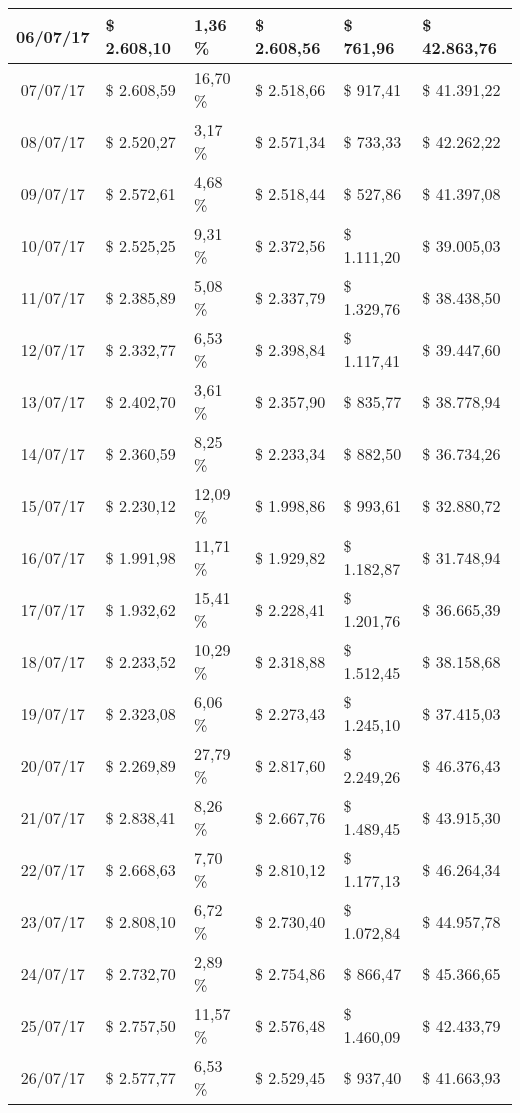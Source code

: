 \begin{small}
\begin{longtable}{|c|l|l|l|l|l|}
06/07/17 & \$ 2.608,10 & 1,36 \% & \$ 2.608,56 & \$ 761,96 & \$ 42.863,76 \\ \hline
07/07/17 & \$ 2.608,59 & 16,70 \% & \$ 2.518,66 & \$ 917,41 & \$ 41.391,22 \\ \hline
08/07/17 & \$ 2.520,27 & 3,17 \% & \$ 2.571,34 & \$ 733,33 & \$ 42.262,22 \\ \hline
09/07/17 & \$ 2.572,61 & 4,68 \% & \$ 2.518,44 & \$ 527,86 & \$ 41.397,08 \\ \hline
10/07/17 & \$ 2.525,25 & 9,31 \% & \$ 2.372,56 & \$ 1.111,20 & \$ 39.005,03 \\ \hline
11/07/17 & \$ 2.385,89 & 5,08 \% & \$ 2.337,79 & \$ 1.329,76 & \$ 38.438,50 \\ \hline
12/07/17 & \$ 2.332,77 & 6,53 \% & \$ 2.398,84 & \$ 1.117,41 & \$ 39.447,60 \\ \hline
13/07/17 & \$ 2.402,70 & 3,61 \% & \$ 2.357,90 & \$ 835,77 & \$ 38.778,94 \\ \hline
14/07/17 & \$ 2.360,59 & 8,25 \% & \$ 2.233,34 & \$ 882,50 & \$ 36.734,26 \\ \hline
15/07/17 & \$ 2.230,12 & 12,09 \% & \$ 1.998,86 & \$ 993,61 & \$ 32.880,72 \\ \hline
16/07/17 & \$ 1.991,98 & 11,71 \% & \$ 1.929,82 & \$ 1.182,87 & \$ 31.748,94 \\ \hline
17/07/17 & \$ 1.932,62 & 15,41 \% & \$ 2.228,41 & \$ 1.201,76 & \$ 36.665,39 \\ \hline
18/07/17 & \$ 2.233,52 & 10,29 \% & \$ 2.318,88 & \$ 1.512,45 & \$ 38.158,68 \\ \hline
19/07/17 & \$ 2.323,08 & 6,06 \% & \$ 2.273,43 & \$ 1.245,10 & \$ 37.415,03 \\ \hline
20/07/17 & \$ 2.269,89 & 27,79 \% & \$ 2.817,60 & \$ 2.249,26 & \$ 46.376,43 \\ \hline
21/07/17 & \$ 2.838,41 & 8,26 \% & \$ 2.667,76 & \$ 1.489,45 & \$ 43.915,30 \\ \hline
22/07/17 & \$ 2.668,63 & 7,70 \% & \$ 2.810,12 & \$ 1.177,13 & \$ 46.264,34 \\ \hline
23/07/17 & \$ 2.808,10 & 6,72 \% & \$ 2.730,40 & \$ 1.072,84 & \$ 44.957,78 \\ \hline
24/07/17 & \$ 2.732,70 & 2,89 \% & \$ 2.754,86 & \$ 866,47 & \$ 45.366,65 \\ \hline
25/07/17 & \$ 2.757,50 & 11,57 \% & \$ 2.576,48 & \$ 1.460,09 & \$ 42.433,79 \\ \hline
26/07/17 & \$ 2.577,77 & 6,53 \% & \$ 2.529,45 & \$ 937,40 & \$ 41.663,93 \\ \hline

\end{longtable}
\end{small}
